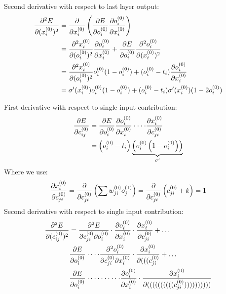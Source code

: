 \documentclass{article}
\newcommand{\Out}[2]{o_{#1}^{(#2)}}
\newcommand{\Target}[1]{t_{#1}}
\newcommand{\Input}[2]{x_{#1}^{(#2)}}
\newcommand{\Weight}[3]{w_{#1#2}^{(#3)}}
\newcommand{\Con}[3]{c_{#1#2}^{(#3)}}
\begin{document}
Second derivative with respect to last layer output:
\begin{align}
\pdv[2]{E}{(\Input i 0)} &= \pdv{}{\Input i 0}
\left(
\pdv{E}{\Out i 0}
\pdv{\Out i 0}{\Input i 0}
\right) \\
&= \pdv[2]{\Input i 0}{(\Out i 0)}\pdv{\Out i 0}{\Input i 0}
+ \pdv{E}{\Out i 0}\pdv[2]{\Out i 0}{(\Input i 0)} \\
&= \pdv[2]{\Input i 0}{(\Out i 0)} \Out i 0 (1 - \Out i 0)
+ (\Out i 0 - \Target i)\pdv{\Out i 0}{\Input i 0}(1 - 2 \Out i 0) \\
&= \sigma'(\Input i 0)\Out i 0(1 - \Out i 0)
+ (\Out i 0 - \Target i)\sigma'(\Input i 0)(1 - 2 \Out i 0)
\end{align}

First derivative with respect to single input contribution:
\begin{align}
\pdv{E}{\Con i j 0} &= \pdv{E}{\Out i 0}\pdv{\Out i 0}{\Input i 0}
\cdot
\cdot
\cdot
\cdot\pdv{\Input i 0}{\Con j i 0}\\
&= \left(\Out i 0 - \Target i \right) \underbrace{\left(\Out i 0 \left(1 - \Out i 0\right) \right)}_{\sigma'}
\end{align}
Where we use:
\begin{align}
\pdv{\Input i 0}{\Con j i 0} = \pdv{}{\Con j i 0}\left( \sum\Weight j i 0\Out j 1 \right) = \pdv{}{\Con j i 0} \left(\Con j i 0 + k \right) = 1\\
\end{align}
Second derivative with respect to single input contribution:
\begin{align}
\pdv[2]{E}{(\Con i j 0)} &= \pdv{E}{\Con j i 0}{\Out i 0}
\cdot\pdv{\Out i 0}{\Input i 0}
\cdot\pdv{\Input i 0}{\Con j i 0} + \ldots\\
& \pdv{E}{\Out i 0}\cdot
\cdot
\cdot
\cdot\pdv{\Out i 0}{\Con j i 0}{\Input i 0}

\cdot\pdv{\Input i 0}{(((\Con j i 0} + \ldots\\
& \pdv{E}{\Out i 0}
\cdot
\cdot
\cdot
\cdot
\cdot
\cdot
\cdot
\cdot
\cdot
\cdot\pdv{\Out i 0}{\Input i 0}



\cdot\pdv{\Input i 0}{((((((((((\Con j i 0))))))))))} \label{zeroterm}









\end{align}
\end{document}
